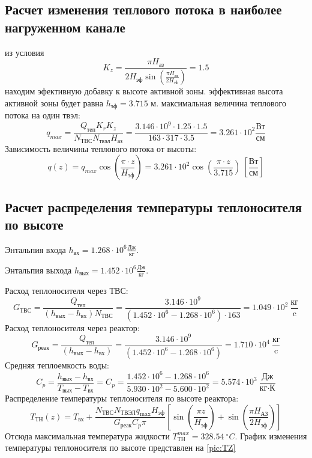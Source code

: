 \subsection{Расчет изменения теплового потока в наиболее нагруженном канале}
из условия $$
K_z = \frac {\pi H_{\text{аз}}} {2 H_{\text{эф}} \sin \left(\frac {\pi H_{\text{аз}}}{2H_{\text{эф}}}\right)}  = 1.5
$$ 
находим эфективную добавку к высоте активной зоны. эффективная высота активной зоны будет равна $h_{\text{эф}} = 3.715$ м. максимальная величина теплового потока на один твэл:
\begin{equation}
q_{max} = \frac {Q_{\text{теп}}K_r K_z}{N_{\text{ТВС}}N_{\text{твэл}}H_{\text{аз}}}  
=
\frac 
{ 3.146 \cdot 10^{ 9 } \cdot 1.25 \cdot 1.5  }
{ 163 \cdot 317 \cdot 3.5 }
=3.261 \cdot 10^{ 2 } \frac {\text{Вт}} {\text{см}}
\end{equation}
Зависимость величины теплового потока от высоты:
$$
q(z) = q_{max}\cos\left(\frac {\pi\cdot z} {H_{\text{эф}}}\right) = 3.261 \cdot 10^{ 2 }\cos \left(\frac {\pi \cdot z} {3.715} \right)\ \left[\frac{\text{Вт}}{\text{см}} \right]
$$

\subsection{Расчет распределения температуры теплоносителя по высоте}

Энтальпия входа $h_{\text{вх}} =1.268 \cdot 10^6 \frac{Дж}{кг}$.%

\noindent Энтальпия выхода $h_{\text{вых}} =1.452 \cdot 10^6 \frac{Дж}{кг}$. %

\noindent Расход теплоносителя через ТВС:
$$
G_{\text{ТВС}} = \frac {Q_{\text{теп}}} {(h_{\text{вых}} - h_{\text{вх}})N_{\text{ТВС}}}
=
\frac { 3.146 \cdot 10^{ 9 } } { ( 1.452 \cdot 10^{ 6 } - 1.268 \cdot 10^{ 6 }) \cdot 163 } = 1.049 \cdot 10^{ 2 } \ \frac {\text{кг}}{\text{c}}
$$
Расход теплоносителя через реактор:
$$
G_{\text{реак}} = \frac {Q_{\text{теп}}} {(h_{\text{вых}} - h_{\text{вх}})}
=
\frac { 3.146 \cdot 10^{ 9 } } { ( 1.452 \cdot 10^{ 6 } - 1.268 \cdot 10^{ 6 }) } = 1.710 \cdot 10^{ 4 } \ \frac {\text{кг}}{\text{c}}
$$
Средняя теплоемкость воды:
$$
C_p = \frac {h_{\text{вых}} - h_{\text{вх}}} {T_{\text{вых}} - T_{\text{вх}}}
=
C_p = \frac { 1.452 \cdot 10^{ 6 } - 1.268 \cdot 10^{ 6 } } { 5.930 \cdot 10^{ 2 } - 5.600 \cdot 10^{ 2 } } = 5.574 \cdot 10^{ 3 } \ \frac{ \text{Дж}} { \text{кг} \cdot \text{К} }
$$
\noindent Распределение температуры теплоносителя по высоте реактора:
$$
T_{ТН}(z) = T_{\text{вх}} + \frac {N_{\text{ТВС}}N_{\text{ТВЭЛ}}q_{\max}H_{\text{эф}}} {G_{\text{реак}}C_p\pi}\left[\sin \left(\frac {\pi z}{H_{\text{эф}}} \right) +\sin \left(\frac {\pi H_{\text{АЗ}}} {2H_{\text{эф}}} \right) \right]
$$
\noindent Отсюда максимальная температура жидкости $T_{\text{ТН}}^{max} = 328.54\  ^\circ C$.
График изменения температуры теплоносителя по высоте представлен на \ref{pic:TZ}

